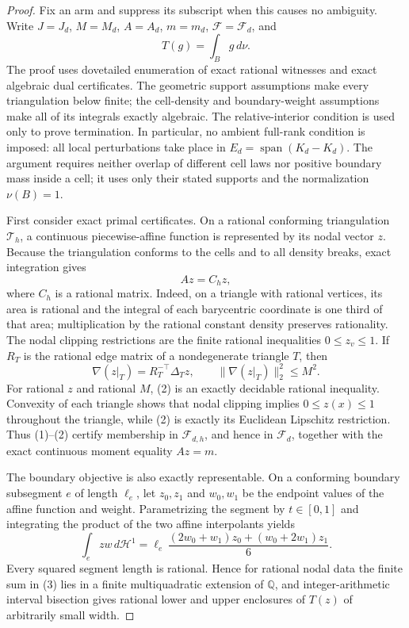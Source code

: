 \documentclass{article}
\begin{document}
\begin{proof}
Fix an arm and suppress its subscript when this causes no ambiguity.  Write
\(J=J_d\), \(M=M_d\), \(A=A_d\), \(m=m_d\),
\(\mathcal F=\mathcal F_d\), and
\[
 T(g)=\int_B g\,d\nu.
\]
The proof uses dovetailed enumeration of exact rational witnesses and exact
algebraic dual certificates.  The geometric support assumptions make every
triangulation below finite; the cell-density and boundary-weight assumptions
make all of its integrals exactly algebraic.  The relative-interior condition
is used only to prove termination.  In particular, no ambient full-rank
condition is imposed: all local perturbations take place in
\(E_d=\operatorname{span}(K_d-K_d)\).  The argument requires neither overlap
of different cell laws nor positive boundary mass inside a cell; it uses only
their stated supports and the normalization \(\nu(B)=1\).

First consider exact primal certificates.  On a rational conforming
triangulation \(\mathcal T_h\), a continuous piecewise-affine function is
represented by its nodal vector \(z\).  Because the triangulation conforms to
the cells and to all density breaks, exact integration gives
\[
 Az=C_hz,                                                     \tag{1}
\]
where \(C_h\) is a rational matrix.  Indeed, on a triangle with rational
vertices, its area is rational and the integral of each barycentric coordinate
is one third of that area; multiplication by the rational constant density
preserves rationality.  The nodal clipping restrictions are the finite rational
inequalities \(0\leq z_v\leq1\).  If \(R_T\) is the rational edge matrix of a
nondegenerate triangle \(T\), then
\[
 \nabla(z|_T)=R_T^{-\top}\Delta_Tz,
 \qquad
 \|\nabla(z|_T)\|_2^2\leq M^2.                              \tag{2}
\]
For rational \(z\) and rational \(M\), (2) is an exactly decidable rational
inequality.  Convexity of each triangle shows that nodal clipping implies
\(0\leq z(x)\leq1\) throughout the triangle, while (2) is exactly its
Euclidean Lipschitz restriction.  Thus (1)--(2) certify membership in
\(\mathcal F_{d,h}\), and hence in \(\mathcal F_d\), together with the exact
continuous moment equality \(Az=m\).

The boundary objective is also exactly representable.  On a conforming
boundary subsegment \(e\) of length \(\ell_e\), let \(z_0,z_1\) and
\(w_0,w_1\) be the endpoint values of the affine function and weight.
Parametrizing the segment by \(t\in[0,1]\) and integrating the product of the
two affine interpolants yields
\[
 \int_e zw\,d\mathcal H^1
 =\ell_e\,
   \frac{(2w_0+w_1)z_0+(w_0+2w_1)z_1}{6}.                  \tag{3}
\]
Every squared segment length is rational.  Hence for rational nodal data the
finite sum in (3) lies in a finite multiquadratic extension of \(\mathbb Q\),
and integer-arithmetic interval bisection gives rational lower and upper
enclosures of \(T(z)\) of arbitrarily small width.


\end{proof}
\end{document}
